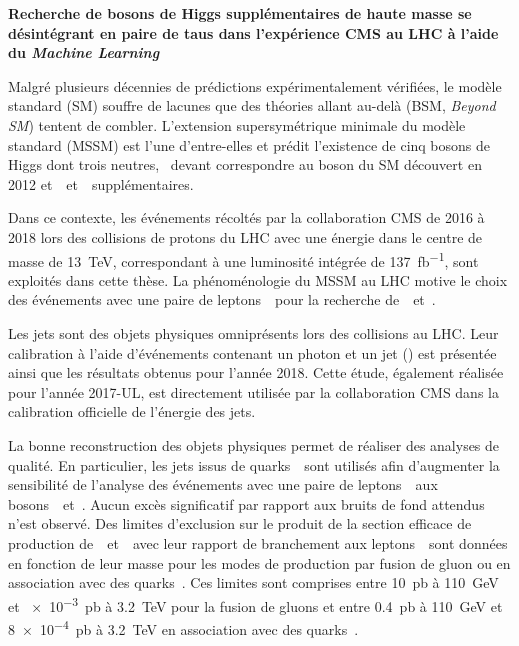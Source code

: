 \begin{center}
\LARGE
\bf
\sffamily
Recherche de bosons de Higgs supplémentaires de haute masse se désintégrant en paire de taus dans l'expérience CMS au LHC à l'aide du \emph{Machine Learning}
\end{center}
\bigskip

Malgré plusieurs décennies de prédictions expérimentalement vérifiées,
le modèle standard (SM) souffre de lacunes
que des théories allant au-delà (BSM, \emph{Beyond SM})
tentent de combler.
L'extension supersymétrique minimale du modèle standard (MSSM)
est l'une d'entre-elles
et
prédit l'existence de cinq bosons de Higgs dont trois neutres,
\higgs\ devant correspondre au boson du SM découvert en 2012
et~\Higgs\ et~\HiggsA\ supplémentaires.
\par
Dans ce contexte,
les événements récoltés par la collaboration CMS
de 2016 à 2018
lors des collisions de protons du LHC
avec une énergie dans le centre de masse de \SI{13}{\TeV},
correspondant à une luminosité intégrée de \SI{137}{\femto\barn^{-1}},
sont exploités dans cette thèse.
La phénoménologie du MSSM au LHC
motive le choix des événements avec une paire de leptons~\tau\ pour la recherche de~\Higgs\ et~\HiggsA.
\par
Les jets sont des objets physiques omniprésents lors des collisions au LHC.
Leur calibration à l'aide d'événements contenant un photon et un jet (\Gjet) est présentée ainsi que les résultats obtenus pour l'année 2018.
Cette étude,
également réalisée pour l'année 2017-UL,
est directement utilisée par la collaboration CMS dans la calibration officielle
de l'énergie des jets.
\par
La bonne reconstruction des objets physiques permet de réaliser des analyses de qualité.
En particulier, les jets issus de quarks~\quarkb\ sont utilisés afin d'augmenter la sensibilité de l'analyse
des événements avec une paire de leptons~\tau\ aux bosons~\Higgs\ et~\HiggsA.
Aucun excès significatif par rapport aux bruits de fond attendus n'est observé.
Des limites d'exclusion sur le produit de la section efficace de production de~\Higgs\ et~\HiggsA\ avec leur rapport de branchement aux leptons~\tau\ sont données
en fonction de leur masse
pour les modes de production par fusion de gluon ou en association avec des quarks~\quarkb.
Ces limites sont comprises entre
\SI{10}{\pico\barn} à \SI{110}{\GeV}
et
\SI{e-3}{\pico\barn} à \SI{3.2}{\TeV}
pour la fusion de gluons
et entre
\SI{0.4}{\pico\barn} à \SI{110}{\GeV}
et
\SI{8e-4}{\pico\barn} à \SI{3.2}{\TeV}
en association avec des quarks~\quarkb.

